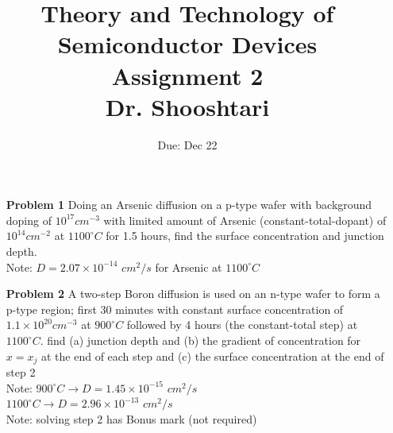 \documentclass{report}
\title{Theory and Technology of Semiconductor Devices\\ Assignment 2 \\ \vspace{30pt} Dr. Shooshtari}
\author{}
\date{Due: Dec 22}
\begin{document}
	\maketitle
	
	\begin{enumerate}
		\item[\bf{Problem 1}] Doing an Arsenic diffusion on a p-type wafer with background doping of $10^{17} cm^{-3}$ with limited amount of Arsenic (constant-total-dopant) of $10^{14} cm^{-2}$ at $1100^{\circ} C$ for 1.5 hours, find the surface concentration and junction depth. \\
		Note: $D=2.07\times 10^{-14}$ $cm^2/s$ for Arsenic at $1100^{\circ} C$
		
		\item[\bf{Problem 2}] A two-step Boron diffusion is used on an n-type wafer to form a p-type region; first 30 minutes with constant surface concentration of $1.1\times 10^{20} cm^{-3}$ at $900^{\circ} C$ followed by 4 hours (the constant-total step) at $1100^{\circ} C$. find (a) junction depth and (b) the gradient of concentration for $x=x_j$ at the end of each step and (c) the surface concentration at the end of step 2\\
		Note: $900^{\circ} C \rightarrow D = 1.45\times 10^{-15}$ $cm^{2}/s$ \\
		$1100^{\circ} C \rightarrow D = 2.96\times 10^{-13}$ $cm^{2}/s$ \\
		Note: solving step 2 has Bonus mark (not required)
	\end{enumerate}
\end{document}

